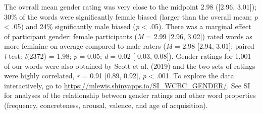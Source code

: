\documentclass[
  english,
  ,man,floatsintext]{apa6}
\begin{document}
The overall mean gender rating was very close to the midpoint 2.98 ({[}2.96, 3.01{]}); 30\% of the words were significantly female biased (larger than the overall mean; \emph{p} \textless{} .05) and 24\% significantly male biased (\emph{p} \textless{} .05). There was a marginal effect of participant gender: female participants (\emph{M} = 2.99 {[}2.96, 3.02{]}) rated words as more feminine on average compared to male raters (\emph{M} = 2.98 {[}2.94, 3.01{]}; paired \emph{t}-test: \emph{t}(2372) = 1.98; \emph{p} = 0.05; \emph{d} = 0.02 {[}-0.03, 0.08{]}). Gender ratings for 1,001 of our words were also obtained by Scott et al. (2019) and the two sets of ratings were highly correlated, \emph{r} = 0.91 {[}0.89, 0.92{]}, \emph{p} \textless{} .001. To explore the data interactively, go to \url{https://mlewis.shinyapps.io/SI_WCBC_GENDER/}. See SI for analyses of the relationship between gender ratings and other word properties (frequency, concreteness, arousal, valence, and age of acquisition).
\end{document}

